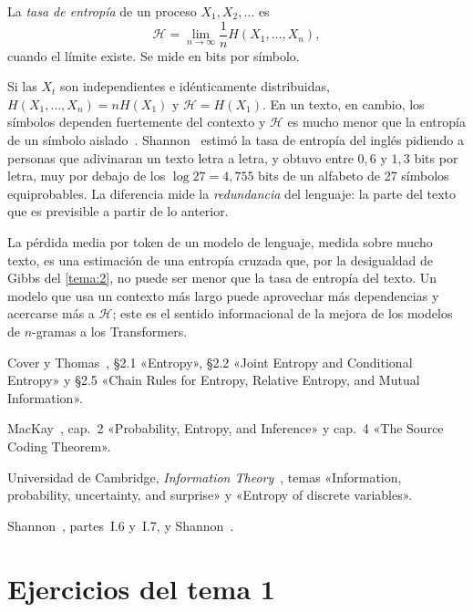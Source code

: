 \begin{definicion}\label{def:tasa}
La \emph{tasa de entropía} de un proceso $X_1,X_2,\dots$ es
\[
\mathcal{H}=\lim_{n\to\infty}\frac1n H(X_1,\dots,X_n),
\]
cuando el límite existe. Se mide en bits por símbolo.
\end{definicion}

Si las $X_t$ son independientes e idénticamente distribuidas, $H(X_1,\dots,X_n)=nH(X_1)$ y $\mathcal{H}=H(X_1)$. En un texto, en cambio, los símbolos dependen fuertemente del contexto y $\mathcal{H}$ es mucho menor que la entropía de un símbolo aislado~\cite[cap.~4]{ct}. Shannon~\cite{shannon51} estimó la tasa de entropía del inglés pidiendo a personas que adivinaran un texto letra a letra, y obtuvo entre $0{,}6$ y $1{,}3$ bits por letra, muy por debajo de los $\log 27=4{,}755$ bits de un alfabeto de 27 símbolos equiprobables. La diferencia mide la \emph{redundancia} del lenguaje: la parte del texto que es previsible a partir de lo anterior.

\begin{observacion}
La pérdida media por token de un modelo de lenguaje, medida sobre mucho texto, es una estimación de una entropía cruzada que, por la desigualdad de Gibbs del \cref{tema:2}, no puede ser menor que la tasa de entropía del texto. Un modelo que usa un contexto más largo puede aprovechar más dependencias y acercarse más a $\mathcal{H}$; este es el sentido informacional de la mejora de los modelos de $n$-gramas a los Transformers.
\end{observacion}

\begin{lecturas}
\item Cover y Thomas~\cite{ct}, §2.1 «Entropy», §2.2 «Joint Entropy and Conditional Entropy» y §2.5 «Chain Rules for Entropy, Relative Entropy, and Mutual Information».
\item MacKay~\cite{mackay}, cap.~2 «Probability, Entropy, and Inference» y cap.~4 «The Source Coding Theorem».
\item Universidad de Cambridge, \emph{Information Theory}~\cite{camit}, temas «Information, probability, uncertainty, and surprise» y «Entropy of discrete variables».
\item Shannon~\cite{shannon}, partes~I.6 y~I.7, y Shannon~\cite{shannon51}.
\end{lecturas}

\section*{Ejercicios del tema 1}

